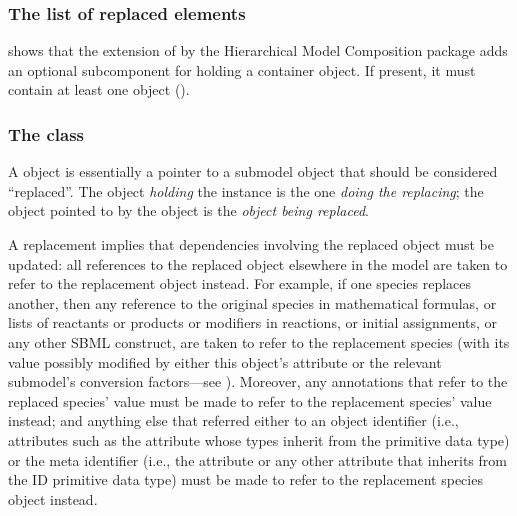
\subsubsection{The list of replaced elements}

 shows that the extension of \SBase by the
Hierarchical Model Composition package adds an optional
 subcomponent for holding a
\ListOfReplacedElements container object.  If present, it must contain
at least one \ReplacedElement object ().


\subsubsection{The  class}
\label{replacedelement-class}
\label{listofreplacedelements-class}

A \ReplacedElement object is essentially a pointer to a submodel object
that should be considered ``replaced''.  The object \emph{holding} the
\ReplacedElement instance is the one \emph{doing the replacing}; the
object pointed to by the \ReplacedElement object is the \emph{object
  being replaced}.

A replacement implies that dependencies involving the replaced object
must be updated: all references to the replaced object elsewhere in the
model are taken to refer to the replacement object instead.  For
example, if one species replaces another, then any reference to the
original species in mathematical formulas, or lists of reactants or
products or modifiers in reactions, or initial assignments, or any other
SBML construct, are taken to refer to the replacement species (with its
value possibly modified by either this object's 
attribute or the relevant submodel's conversion factors---see
). Moreover, any annotations that refer to the
replaced species'  value must be made to refer to the
replacement species'  value instead; and anything else
that referred either to an object identifier (i.e., attributes such as
the  attribute whose types inherit from the 
primitive data type) or the meta identifier (i.e., the 
attribute or any other attribute that inherits from the ID primitive
data type) must be made to refer to the replacement species object
instead.

